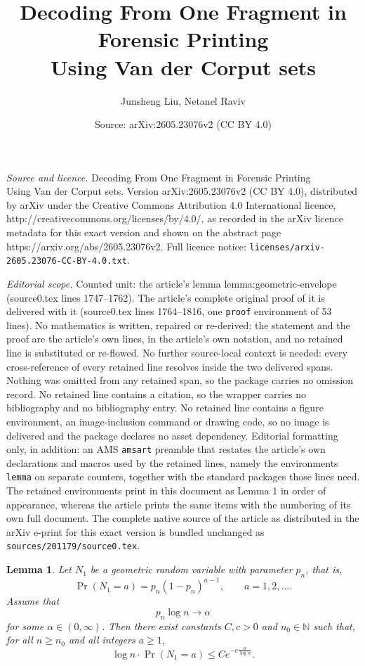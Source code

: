 \documentclass[10pt,a4paper]{amsart}
\title{Decoding From One Fragment in Forensic Printing\\Using Van der Corput sets}
\author{Junsheng Liu, Netanel Raviv}
\date{Source: arXiv:2605.23076v2 (CC BY 4.0)}
\newtheorem{lemma}{Lemma}
\begin{document}
\maketitle

\noindent\emph{Source and licence.} Decoding From One Fragment in Forensic Printing\\Using Van der Corput sets. Version arXiv:2605.23076v2 (CC BY 4.0), distributed by arXiv under the Creative Commons Attribution 4.0 International licence, http://creativecommons.org/licenses/by/4.0/, as recorded in the arXiv licence metadata for this exact version and shown on the abstract page https://arxiv.org/abs/2605.23076v2. Full licence notice: \texttt{licenses/arxiv-2605.23076-CC-BY-4.0.txt}.\par\smallskip

\noindent\textit{Editorial scope.} Counted unit: the article's lemma lemma:geometric-envelope (source0.tex lines 1747--1762). The article's complete original proof of it is delivered with it (source0.tex lines 1764--1816, one \texttt{proof} environment of 53 lines). No mathematics is written, repaired or re-derived: the statement and the proof are the article's own lines, in the article's own notation, and no retained line is substituted or re-flowed.  No further source-local context is needed: every cross-reference of every retained line resolves inside the two delivered spans.  Nothing was omitted from any retained span, so the package carries no omission record.  No retained line contains a citation, so the wrapper carries no bibliography and no bibliography entry.  No retained line contains a figure environment, an image-inclusion command or drawing code, so no image is delivered and the package declares no asset dependency.  Editorial formatting only, in addition: an AMS \texttt{amsart} preamble that restates the article's own declarations and macros used by the retained lines, namely the environments \texttt{lemma} on separate counters, together with the standard packages those lines need.  The retained environments print in this document as Lemma 1 in order of appearance, whereas the article prints the same items with the numbering of its own full document.  The complete native source of the article as distributed in the arXiv e-print for this exact version is bundled unchanged as \texttt{sources/201179/source0.tex}.
\begin{lemma}\label{lemma:geometric-envelope}
Let \(N_1\) be a geometric random variable with parameter \(p_n\), that is,
\[
    \Pr(N_1=a)=p_n(1-p_n)^{a-1},\qquad a=1,2,\ldots .
\]
Assume that
\[
    p_n\log n\to \alpha
\]
for some \(\alpha\in(0,\infty)\). Then there exist constants \(C,c>0\) and \(n_0\in\mathbb N\) such that, for all \(n\ge n_0\) and all integers \(a\ge 1\),
\[
    \log n\cdot \Pr(N_1=a)
    \le
    Ce^{-c\frac{a}{\log n}}.
\]
\end{lemma}
\end{document}
